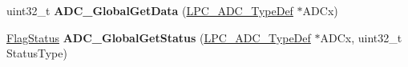 \begin{DoxyCompactItemize}
\item 
\hypertarget{group___a_d_c___public___functions_ga9a8d8047580407a553b485fd91389eac}{uint32\-\_\-t {\bfseries \-A\-D\-C\-\_\-\-Global\-Get\-Data} (\hyperlink{struct_l_p_c___a_d_c___type_def}{\-L\-P\-C\-\_\-\-A\-D\-C\-\_\-\-Type\-Def} $\ast$\-A\-D\-Cx)}\label{group___a_d_c___public___functions_ga9a8d8047580407a553b485fd91389eac}

\item 
\hypertarget{group___a_d_c___public___functions_gab6e90920fdfc81fa1029c4810edcd547}{\hyperlink{group___l_p_c___types___public___types_ga89136caac2e14c55151f527ac02daaff}{\-Flag\-Status} {\bfseries \-A\-D\-C\-\_\-\-Global\-Get\-Status} (\hyperlink{struct_l_p_c___a_d_c___type_def}{\-L\-P\-C\-\_\-\-A\-D\-C\-\_\-\-Type\-Def} $\ast$\-A\-D\-Cx, uint32\-\_\-t \-Status\-Type)}\label{group___a_d_c___public___functions_gab6e90920fdfc81fa1029c4810edcd547}

\end{DoxyCompactItemize}
